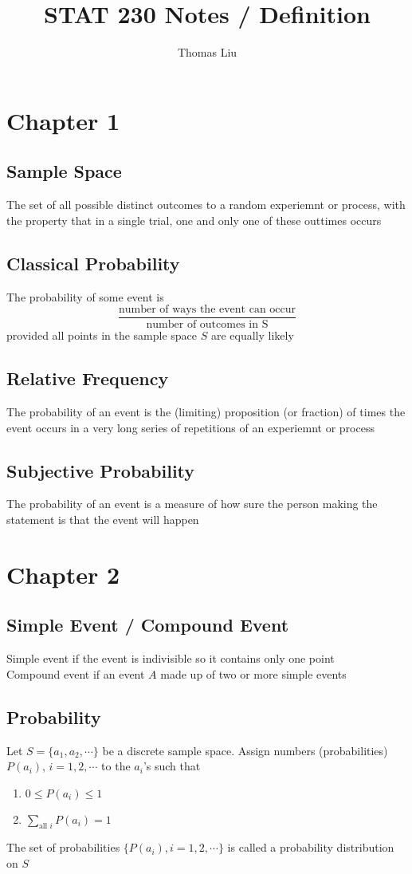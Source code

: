 \documentclass[11pt]{article}
\title{STAT 230 Notes / Definition}
\author{Thomas Liu}
\begin{document}
\maketitle
\tableofcontents

\newpage 

\section{Chapter 1}
\subsection{Sample Space}
The set of all possible distinct outcomes to a random experiemnt or process, with the property that in a single trial, one and only one of these outtimes occurs
\subsection{Classical Probability}
The probability of some event is \[\frac{\text{number of ways the event can occur}}{\text{number of outcomes in S}}\]
provided all points in the sample space $S$ are equally likely
\subsection{Relative Frequency}
The probability of an event is the (limiting) proposition (or fraction) of times the event occurs in a very long series of repetitions of an experiemnt or process
\subsection{Subjective Probability}
The probability of an event is a measure of how sure the person making the statement is that the event will happen

\section{Chapter 2}
\subsection{Simple Event / Compound Event}
Simple event if the event is indivisible so it contains only one point \\
Compound event if an event $A$ made up of two or more simple events
\subsection{Probability}
Let $S=\{a_1, a_2, \cdots\}$ be a discrete sample space. Assign numbers (probabilities) $P(a_i)$, $i=1,2,\cdots$ to the $a_i$'s such that 
\begin{enumerate}
    \item $0\leq P(a_i)\leq 1$
    \item $\displaystyle\sum_{\text{all }i}P(a_i) = 1$
\end{enumerate}
The set of probabilities $\{P(a_i), i=1,2,\cdots\}$ is called a probability distribution on $S$
\end{document}
